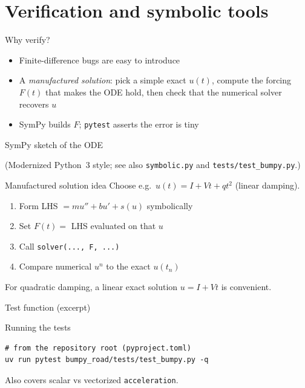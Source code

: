 \section{Verification and symbolic tools}

\begin{frame}{Why verify?}
  \begin{itemize}
    \item Finite-difference bugs are easy to introduce
    \item A \emph{manufactured solution}: pick a simple exact $u(t)$,
          compute the forcing $F(t)$ that makes the ODE hold,
          then check that the numerical solver recovers $u$
    \item SymPy builds $F$; \texttt{pytest} asserts the error is tiny
  \end{itemize}
\end{frame}

\begin{frame}[fragile]{SymPy sketch of the ODE}
  
  (Modernized Python~3 style; see also \texttt{symbolic.py}
  and \texttt{tests/test\_bumpy.py}.)
\end{frame}

\begin{frame}{Manufactured solution idea}
  Choose e.g.\ $u(t) = I + Vt + qt^2$ (linear damping).
  \begin{enumerate}
    \item Form LHS $= m u'' + b u' + s(u)$ symbolically
    \item Set $F(t) =$ LHS evaluated on that $u$
    \item Call \texttt{solver(..., F, ...)}
    \item Compare numerical $u^n$ to the exact $u(t_n)$
  \end{enumerate}
  For quadratic damping, a linear exact solution
  $u = I + Vt$ is convenient.
\end{frame}

\begin{frame}[fragile]{Test function (excerpt)}
  
\end{frame}

\begin{frame}[fragile]{Running the tests}
\begin{lstlisting}[style=terminal]
# from the repository root (pyproject.toml)
uv run pytest bumpy_road/tests/test_bumpy.py -q
\end{lstlisting}
  Also covers scalar vs vectorized \texttt{acceleration}.
\end{frame}

